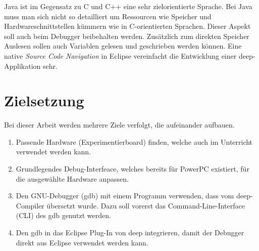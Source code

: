 Java ist im Gegensatz zu C und C++ eine sehr zielorientierte Sprache.
Bei Java muss man sich nicht so detailliert um Ressourcen wie Speicher und Hardwareschnittstellen kümmern wie in C-orientierten Sprachen.
Dieser Aspekt soll auch beim Debugger beibehalten werden.
Zusätzlich zum direkten Speicher Auslesen sollen auch Variablen gelesen und geschrieben werden können.
Eine native \textit{Source Code Navigation} in Eclipse vereinfacht die Entwicklung einer deep-Applikation sehr.



\section{Zielsetzung}
Bei dieser Arbeit werden mehrere Ziele verfolgt, die aufeinander aufbauen.


\begin{enumerate}
\item Passende Hardware (Experimentierboard) finden, welche auch im Unterricht verwendet werden kann.
\item Grundlegendes Debug-Interfeace, welches bereits für PowerPC existiert, für die ausgewählte Hardware anpassen.
\item Den GNU-Debugger (gdb) mit einem Programm verwenden, dass vom deep-Compiler übersetzt wurde. Dazu soll vorerst das Command-Line-Interface (CLI) des gdb genutzt werden.
\item Den gdb in das Eclipse Plug-In von deep integrieren, damit der Debugger direkt aus Eclipse verwendet werden kann.
\end{enumerate}








